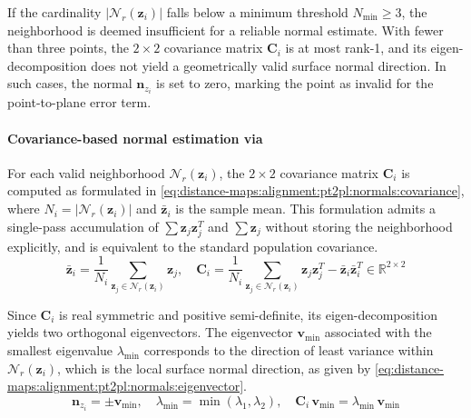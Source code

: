 If the cardinality $|\mathcal{N}_r(\mathbf{z}_i)|$ falls below a minimum
threshold $N_{\min} \geq 3$, the neighborhood is deemed insufficient for a
reliable normal estimate. With fewer than three points, the $2\times 2$
covariance matrix $\mathbf{C}_i$ is at most rank-1, and its eigen-decomposition
does not yield a geometrically valid surface normal direction.
In such cases, the normal $\mathbf{n}_{z_i}$ is set to zero, marking the point
as invalid for the point-to-plane error term.

\paragraph{Covariance-based normal estimation via }
For each valid neighborhood $\mathcal{N}_r(\mathbf{z}_i)$, the $2\times2$
covariance matrix $\mathbf{C}_i$ is computed as formulated in
\eqref{eq:distance-maps:alignment:pt2pl:normals:covariance}, where
$N_i = |\mathcal{N}_r(\mathbf{z}_i)|$ and $\bar{\mathbf{z}}_i$ is the sample
mean. This formulation admits a single-pass accumulation of
$\sum \mathbf{z}_j \mathbf{z}_j^T$ and $\sum \mathbf{z}_j$ without storing the
neighborhood explicitly, and is equivalent to the standard population covariance.
\begin{equation}
\label{eq:distance-maps:alignment:pt2pl:normals:covariance}
\bar{\mathbf{z}}_i =
\frac{1}{N_i}
\sum_{\mathbf{z}_j \in \mathcal{N}_r(\mathbf{z}_i)} \mathbf{z}_j,
\quad
\mathbf{C}_i =
  \frac{1}{N_i}
  \sum_{\mathbf{z}_j \in \mathcal{N}_r(\mathbf{z}_i)}
  \mathbf{z}_j \mathbf{z}_j^T
- \bar{\mathbf{z}}_i \bar{\mathbf{z}}_i^T
\in \mathbb{R}^{2 \times 2}
\end{equation}

Since $\mathbf{C}_i$ is real symmetric and positive semi-definite, its
eigen-decomposition yields two orthogonal eigenvectors. The eigenvector
$\mathbf{v}_{\min}$ associated with the smallest eigenvalue $\lambda_{\min}$
corresponds to the direction of least variance within
$\mathcal{N}_r(\mathbf{z}_i)$, which is the local surface normal direction,
as given by \eqref{eq:distance-maps:alignment:pt2pl:normals:eigenvector}.
\begin{equation}
\label{eq:distance-maps:alignment:pt2pl:normals:eigenvector}
\mathbf{n}_{z_i} = \pm\mathbf{v}_{\min},
\quad
\lambda_{\min} = \min\!\left(\lambda_1, \lambda_2\right),
\quad
\mathbf{C}_i\,\mathbf{v}_{\min} = \lambda_{\min}\,\mathbf{v}_{\min}
\end{equation}

